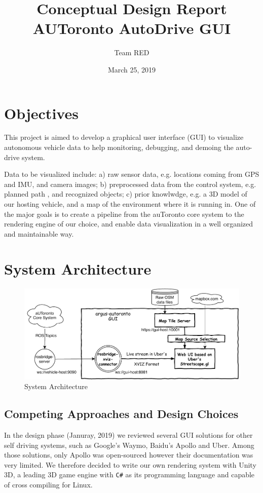 \documentclass{article}
\title{Conceptual Design Report \\
\large AUToronto AutoDrive GUI}
\author{Team RED}
\date{March 25, 2019}
\begin{document}
\maketitle

\section{Objectives}

This project is aimed to develop a graphical user interface (GUI) to visualize autonomous vehicle data to help monitoring, debugging, and demoing the auto-drive system.

Data to be visualized include: a) raw sensor data, e.g. locations coming from GPS and IMU, and camera images; b) preprocessed data from the control system, e.g. planned path , and recognized objects; c) prior knowlwdge, e.g. a 3D model of our hosting vehicle, and a map of the environment where it is running in. One of the major goals is to create a pipeline from the auToronto core system to the rendering engine of our choice, and enable data visualization in a well organized and maintainable way.

\section{System Architecture}

\begin{figure}[htb]
  \centering
  \includegraphics[width=0.7\linewidth]{argus-overview.pdf}
  \caption{System Architecture \cite{github}}
  \label{fig:sys-arch}
\end{figure}

\subsection{Competing Approaches and Design Choices}

In the design phase (Januray, 2019) we reviewed several GUI solutions for other self driving systems, such as Google's Waymo, Baidu's Apollo and Uber. Among those solutions, only Apollo was open-sourced however their documentation was very limited. We therefore decided to write our own rendering system with Unity 3D, a leading 3D game engine with \verb!C#! as its programming language and capable of cross compiling for Linux.
\end{document}

